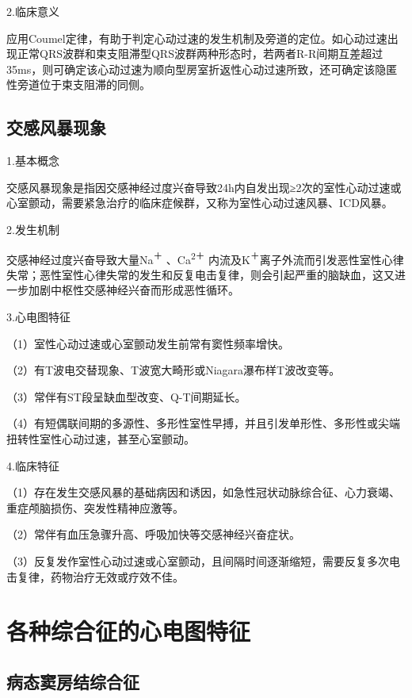 2.临床意义

应用Coumel定律，有助于判定心动过速的发生机制及旁道的定位。如心动过速出现正常QRS波群和束支阻滞型QRS波群两种形态时，若两者R-R间期互差超过35ms，则可确定该心动过速为顺向型房室折返性心动过速所致，还可确定该隐匿性旁道位于束支阻滞的同侧。

\protect\hypertarget{text00047.htmlux5cux23subid548}{}{}

\subsection{交感风暴现象}

1.基本概念

交感风暴现象是指因交感神经过度兴奋导致24h内自发出现≥2次的室性心动过速或心室颤动，需要紧急治疗的临床症候群，又称为室性心动过速风暴、ICD风暴。

2.发生机制

交感神经过度兴奋导致大量Na\textsuperscript{＋} 、Ca\textsuperscript{2＋}
内流及K\textsuperscript{＋}离子外流而引发恶性室性心律失常；恶性室性心律失常的发生和反复电击复律，则会引起严重的脑缺血，这又进一步加剧中枢性交感神经兴奋而形成恶性循环。

3.心电图特征

（1）室性心动过速或心室颤动发生前常有窦性频率增快。

（2）有T波电交替现象、T波宽大畸形或Niagara瀑布样T波改变等。

（3）常伴有ST段呈缺血型改变、Q-T间期延长。

（4）有短偶联间期的多源性、多形性室性早搏，并且引发单形性、多形性或尖端扭转性室性心动过速，甚至心室颤动。

4.临床特征

（1）存在发生交感风暴的基础病因和诱因，如急性冠状动脉综合征、心力衰竭、重症颅脑损伤、突发性精神应激等。

（2）常伴有血压急骤升高、呼吸加快等交感神经兴奋症状。

（3）反复发作室性心动过速或心室颤动，且间隔时间逐渐缩短，需要反复多次电击复律，药物治疗无效或疗效不佳。

\protect\hypertarget{text00047.htmlux5cux23subid549}{}{}

\section{各种综合征的心电图特征}

\protect\hypertarget{text00047.htmlux5cux23subid550}{}{}

\subsection{病态窦房结综合征}

